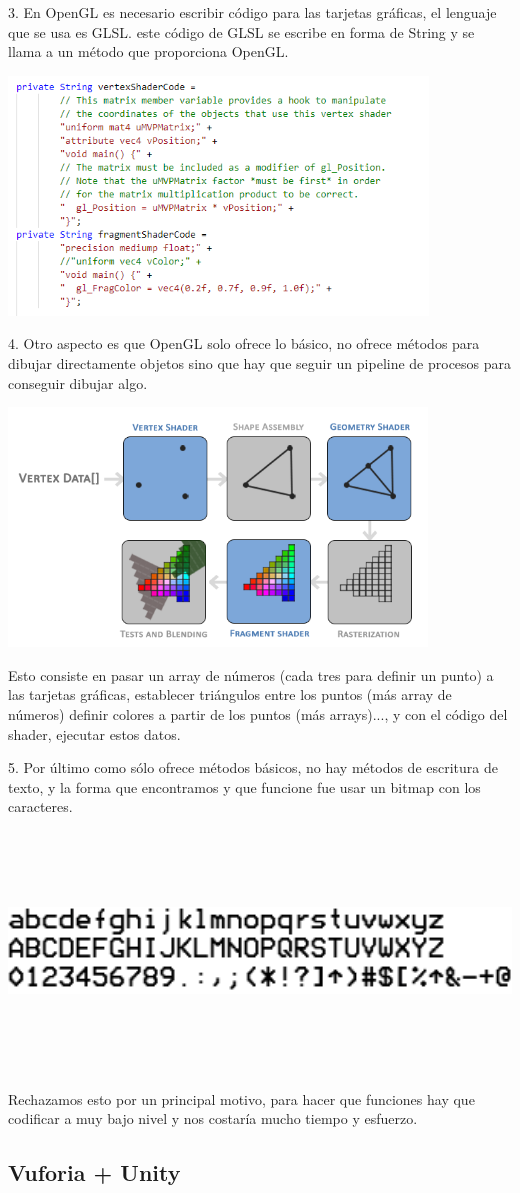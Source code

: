 3. En OpenGL es necesario escribir código para las tarjetas gráficas, el lenguaje que se usa es GLSL.
este código de GLSL se escribe en forma de String y se llama a un método 
que proporciona OpenGL.

\includegraphics[height=2.5in]{figures/GLSL.png}

4. Otro aspecto es que OpenGL solo ofrece lo básico, no ofrece métodos para dibujar directamente objetos sino 
que hay que seguir un pipeline de procesos para conseguir dibujar algo.

\includegraphics[height=2.5in]{figures/pipeline.png}

Esto consiste en pasar un array de números (cada tres para definir un punto) 
a las tarjetas gráficas, establecer triángulos entre los puntos (más array de números) 
definir colores a partir de los puntos (más arrays)..., y con el código del shader, ejecutar 
estos datos.

5. Por último como sólo ofrece métodos básicos, no hay métodos de escritura de texto, y la forma que 
encontramos y que funcione fue usar un bitmap con los caracteres.

\includegraphics[height=2.5in]{figures/bitmap-font.png}

Rechazamos esto por un principal motivo, para hacer que funciones hay que codificar a muy bajo nivel y 
nos costaría mucho tiempo y esfuerzo.
 
\subsection{Vuforia + Unity} 
\label{makereference3.6.4}